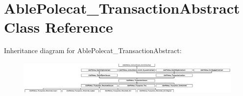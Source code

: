 \hypertarget{class_able_polecat___transaction_abstract}{}\section{Able\+Polecat\+\_\+\+Transaction\+Abstract Class Reference}
\label{class_able_polecat___transaction_abstract}
Inheritance diagram for Able\+Polecat\+\_\+\+Transaction\+Abstract\+:\begin{figure}[H]
\begin{center}
\leavevmode
\includegraphics[height=1.707317cm]{class_able_polecat___transaction_abstract}
\end{center}
\end{figure}
